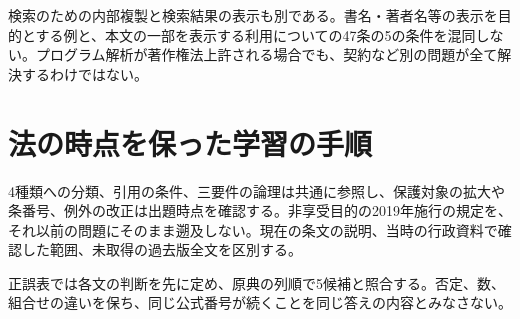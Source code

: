 検索のための内部複製と検索結果の表示も別である。書名・著者名等の表示を目的とする例と、本文の一部を表示する利用についての47条の5の条件を混同しない。プログラム解析が著作権法上許される場合でも、契約など別の問題が全て解決するわけではない。

\section{法の時点を保った学習の手順}
\label{theory:ip:historical}
4種類への分類、引用の条件、三要件の論理は共通に参照し、保護対象の拡大や条番号、例外の改正は出題時点を確認する。非享受目的の2019年施行の規定を、それ以前の問題にそのまま遡及しない。現在の条文の説明、当時の行政資料で確認した範囲、未取得の過去版全文を区別する。

正誤表では各文の判断を先に定め、原典の列順で5候補と照合する。否定、数、組合せの違いを保ち、同じ公式番号が続くことを同じ答えの内容とみなさない。
